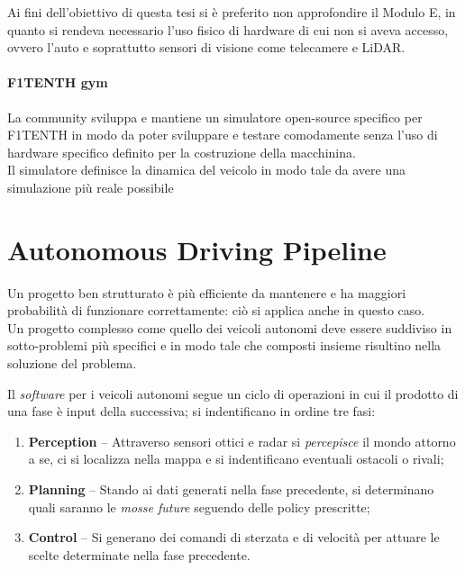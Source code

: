 \noindent Ai fini dell'obiettivo di questa tesi si è preferito non approfondire il Modulo E,
in quanto si rendeva necessario l'uso fisico di hardware di cui non si aveva accesso,
ovvero l'auto e soprattutto sensori di visione come telecamere e LiDAR.

\paragraph{F1TENTH gym}
\label{par:gym}
La community sviluppa e mantiene un simulatore open-source specifico per F1TENTH
in modo da poter sviluppare e testare comodamente
senza l'uso di hardware specifico definito per la costruzione della macchinina.\\
Il simulatore definisce la dinamica del veicolo in modo tale da avere una simulazione
più reale possibile %



\section{Autonomous Driving Pipeline}
Un progetto ben strutturato è più efficiente da mantenere e ha maggiori probabilità
di funzionare correttamente: ciò si applica anche in questo caso.\\
Un progetto complesso come quello dei veicoli autonomi deve essere suddiviso in sotto-problemi
più specifici e in modo tale che composti insieme risultino nella soluzione del problema.
\par

\noindent Il \emph{software} per i veicoli autonomi segue un ciclo di operazioni
in cui il prodotto di una fase è input della successiva; si indentificano in ordine tre fasi:
\begin{enumerate}
	\item \textbf{Perception} -- Attraverso sensori ottici e radar si \emph{percepisce} il mondo attorno a se,
	      ci si localizza nella mappa e si indentificano eventuali ostacoli o rivali;
	\item \textbf{Planning} -- Stando ai dati generati nella fase precedente,
	      si determinano quali saranno le \emph{mosse future} seguendo delle policy prescritte;
	\item \textbf{Control} -- Si generano dei comandi di sterzata e di velocità per attuare le scelte
	      determinate nella fase precedente.
\end{enumerate}

